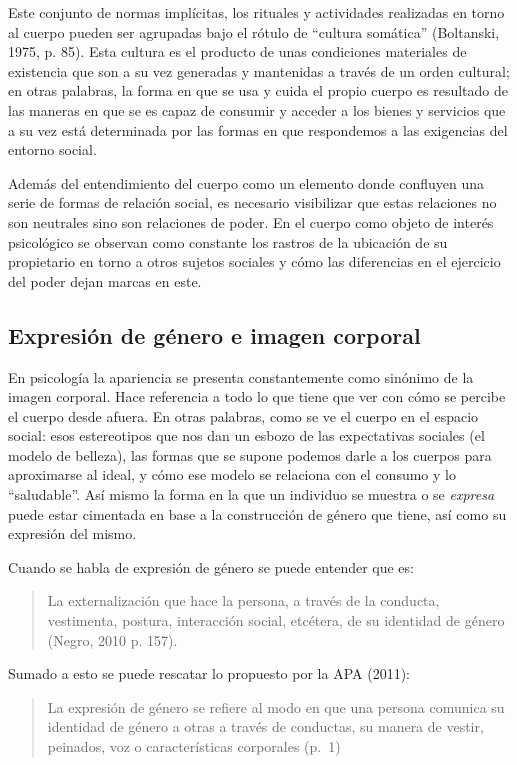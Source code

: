 Este conjunto de normas implícitas, los rituales y actividades realizadas en
torno al cuerpo pueden ser agrupadas bajo el rótulo de “cultura somática”
(Boltanski, 1975, p. 85).
Esta cultura es el producto de unas condiciones materiales de existencia que son
a su vez generadas y mantenidas a través de un orden cultural;
en otras palabras, la forma en que se usa y cuida el propio cuerpo es
resultado de las maneras en que se es capaz de consumir y acceder a los
bienes y servicios que a su vez está determinada por las formas en que
respondemos a las exigencias del entorno social.

Además del entendimiento del cuerpo como un elemento donde confluyen una serie
de formas de relación social, es necesario visibilizar que estas relaciones no
son neutrales sino son relaciones de poder.
En el cuerpo como objeto de interés psicológico se observan como constante los
rastros de la ubicación de su propietario en torno a otros sujetos sociales y
cómo las diferencias en el ejercicio del poder dejan marcas en este.

\subsection{Expresión de género e imagen corporal}
En psicología la apariencia se presenta constantemente como sinónimo de la
imagen corporal.
Hace referencia a todo lo que tiene que ver con cómo se percibe el cuerpo desde
afuera.
En otras palabras, como se ve el cuerpo en el espacio social: esos estereotipos
que nos dan un esbozo de las expectativas sociales (el modelo de belleza), las
formas que se supone podemos darle a los cuerpos para aproximarse al ideal, y
cómo ese modelo se relaciona con el consumo y lo “saludable”.
Así mismo la forma en la que un individuo se muestra o se \emph{expresa} puede
estar
cimentada en base a la construcción de género que tiene, así como su expresión
del mismo.

Cuando se habla de expresión de género se puede entender que es:

\begin{quote}
    La externalización que hace la persona, a través de la conducta, vestimenta,
    postura, interacción social, etcétera, de su identidad de género (Negro, 2010 p.
    157).
\end{quote}

Sumado a esto se puede rescatar lo propuesto por la APA (2011):

\begin{quote}
    La expresión de género se refiere al modo en que una persona comunica su
    identidad de género a otras a través de conductas, su manera de vestir,
    peinados, voz o características corporales (p.~1)
\end{quote}

